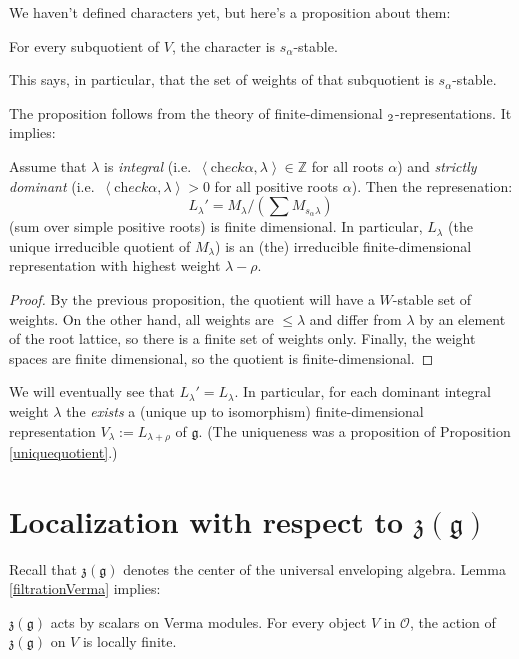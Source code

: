 We haven't defined characters yet, but here's a proposition about them:
\begin{proposition}\label{characterWinv}
 For every subquotient of $V$, the character is $s_\alpha$-stable.
\end{proposition}
This says, in particular, that the set of weights of that subquotient is $s_\alpha$-stable.

The proposition follows from the theory of finite-dimensional $\sl_2$-representations. It implies:
\begin{proposition}
 Assume that $\lambda$ is \emph{integral} (i.e.\ $\left<\text{ch}eck\alpha,\lambda\right>\in \mathbb Z$ for all roots $\alpha$) and \emph{strictly dominant} (i.e.\ $\left<\text{ch}eck\alpha,\lambda\right>>0$ for all positive roots $\alpha$). Then the represenation:
$$L_\lambda' = M_\lambda/\left(\sum M_{s_\alpha\lambda}\right)$$
(sum over simple positive roots) is finite dimensional. In particular, $L_\lambda$ (the unique irreducible quotient of $M_\lambda$) is an (the) irreducible finite-dimensional representation with highest weight $\lambda-\rho$.
\end{proposition}

\begin{proof}
By the previous proposition, the quotient will have a $W$-stable set of weights. On the other hand, all weights are $\le \lambda$ and differ from $\lambda$ by an element of the root lattice, so there is a finite set of weights only. Finally, the weight spaces are finite dimensional, so the quotient is finite-dimensional.
\end{proof}

We will eventually see that $L_\lambda'=L_\lambda$. In particular, for each dominant integral weight $\lambda$ the \emph{exists} a (unique up to isomorphism) finite-dimensional representation $V_\lambda:= L_{\lambda+\rho}$ of $\mathfrak g$. (The uniqueness was a proposition of Proposition \ref{uniquequotient}.)



\section{Localization with respect to $\mathfrak z(\mathfrak g)$}

Recall that $\mathfrak z(\mathfrak g)$ denotes the center of the universal enveloping algebra. Lemma \ref{filtrationVerma} implies:

\begin{lemma}
$\mathfrak z(\mathfrak g)$ acts by scalars on Verma modules.  For every object $V$ in $\mathcal O$, the action of $\mathfrak z(\mathfrak g)$ on $V$ is locally finite.
\end{lemma}

